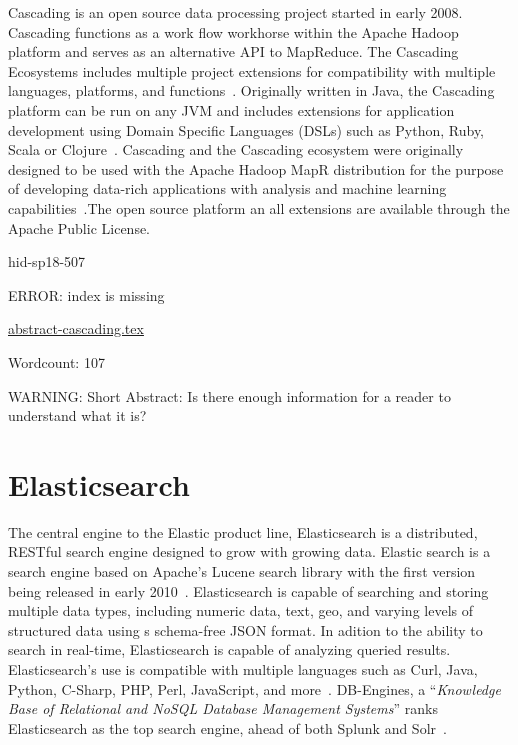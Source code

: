 Cascading is an open source data processing project started in early
2008. Cascading functions as a work flow workhorse within the Apache
Hadoop platform and serves as an alternative API to MapReduce. The
Cascading Ecosystems includes multiple project extensions for
compatibility with multiple languages, platforms, and
functions~\cite{hid-sp18-507-CascadingEco}. Originally written in
Java, the Cascading platform can be run on any JVM and includes
extensions for application development using Domain Specific Languages
(DSLs) such as Python, Ruby, Scala or
Clojure~\cite{hid-sp18-507-GitHubCascading}. Cascading and the
Cascading ecosystem were originally designed to be used with the
Apache Hadoop MapR distribution for the purpose of developing
data-rich applications with analysis and machine learning
capabilities~\cite{hid-sp18-507-MapR}.The open source platform an all
extensions are available through the Apache Public License.


\begin{IU}

hid-sp18-507

ERROR: index is missing

\href{https://github.com/cloudmesh-community/hid-sp18-507/blob/master//technology/abstract-cascading.tex}{abstract-cascading.tex}

 

Wordcount: 107

WARNING: Short Abstract: Is there enough information for a reader to understand what it is?

\end{IU}

\section{Elasticsearch}

The central engine to the Elastic product line, Elasticsearch is a
distributed, RESTful search engine designed to grow with growing
data. Elastic search is a search engine based on Apache's Lucene
search library with the first version being released in early
2010~\cite{hid-sp18-507-ElasticWiki}. Elasticsearch is capable of
searching and storing multiple data types, including numeric data,
text, geo, and varying levels of structured data using s schema-free
JSON format. In adition to the ability to search in real-time,
Elasticsearch is capable of analyzing queried results. Elasticsearch's
use is compatible with multiple languages such as Curl, Java, Python,
C-Sharp, PHP, Perl, JavaScript, and
more~\cite{hid-sp18-507-Elasticsearch}. DB-Engines, a \color{blue}``\emph{Knowledge Base
of Relational and NoSQL Database Management Systems}''\color{black} ranks
Elasticsearch as the top search engine, ahead of both Splunk and
Solr~\cite{hid-sp18-507-DBEngines}.


